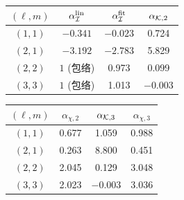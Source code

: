 \documentclass[UTF8,fontset=fandol,12pt,a4paper,oneside,openany]{ctexrep}
\begin{document}
\noindent\begin{minipage}{\linewidth}
\captionsetup{type=table}\caption{历史线性强度、非线性 Green 核和总响应的有效幂分解，待复核。}\label{audit:tab:cft-factorization}
\centering\fontsize{10.5}{14}\selectfont
\setlength{\tabcolsep}{6pt}\renewcommand{\arraystretch}{1.2}
\par{}\par\smallskip
\begin{tabular}{cccc}\toprule
$(\ell,m)$ & $\alpha_{\cal I}^{\rm lin}$ & $\alpha_{\cal I}^{\rm fit}$ & $\alpha_{{\cal K},2}$\\\midrule
$(1,1)$ & $-0.341$ & $-0.023$ & 0.724\\
$(2,1)$ & $-3.192$ & $-2.783$ & 5.829\\
$(2,2)$ & $1$ (包络) & 0.973 & 0.099\\
$(3,3)$ & $1$ (包络) & 1.013 & $-0.003$\\
\bottomrule\end{tabular}
\par\medskip
\par{}\par\smallskip
\begin{tabular}{cccc}\toprule
$(\ell,m)$ & $\alpha_{\chi,2}$ & $\alpha_{{\cal K},3}$ & $\alpha_{\chi,3}$\\\midrule
$(1,1)$ & 0.677 & 1.059 & 0.988\\
$(2,1)$ & 0.263 & 8.800 & 0.451\\
$(2,2)$ & 2.045 & 0.129 & 3.048\\
$(3,3)$ & 2.023 & $-0.003$ & 3.036\\
\bottomrule\end{tabular}
\end{minipage}\par\addvspace{10pt}
\par\addvspace{14pt}
\end{document}
